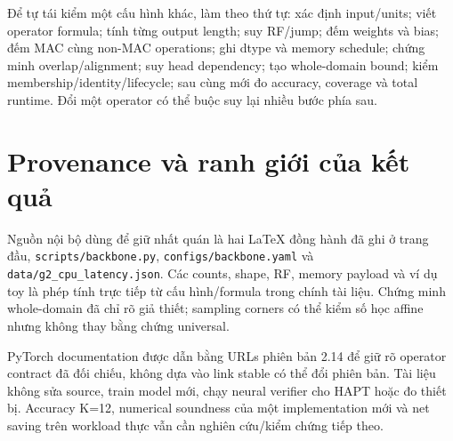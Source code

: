 \documentclass[11pt,a4paper]{article}
\newcommand{\code}[1]{{\small\ttfamily\nolinkurl{#1}}}
\theoremstyle{definition}
\begin{document}
Để tự tái kiểm một cấu hình khác, làm theo thứ tự: xác định input/units;
viết operator formula; tính từng output length; suy RF/jump; đếm
weights và bias; đếm MAC cùng non-MAC operations; ghi dtype và memory
schedule; chứng minh overlap/alignment; suy head dependency; tạo
whole-domain bound; kiểm membership/identity/lifecycle; sau cùng mới đo
accuracy, coverage và total runtime. Đổi một operator có thể buộc suy
lại nhiều bước phía sau.

\section{Provenance và ranh giới của kết quả}
Nguồn nội bộ dùng để giữ nhất quán là hai LaTeX đồng hành đã ghi ở trang
đầu, \code{scripts/backbone.py}, \code{configs/backbone.yaml} và
\code{data/g2_cpu_latency.json}. Các counts, shape, RF, memory payload
và ví dụ toy là phép tính trực tiếp từ cấu hình/formula trong chính tài
liệu. Chứng minh whole-domain đã chỉ rõ giả thiết; sampling corners có
thể kiểm số học affine nhưng không thay bằng chứng universal.

PyTorch documentation được dẫn bằng URLs phiên bản 2.14 để giữ rõ
operator contract đã đối chiếu, không dựa vào link stable có thể đổi
phiên bản. Tài liệu không sửa source, train model mới, chạy neural
verifier cho HAPT hoặc đo thiết bị. Accuracy K=12, numerical soundness
của một implementation mới và net saving trên workload thực vẫn cần
nghiên cứu/kiểm chứng tiếp theo.
\end{document}
